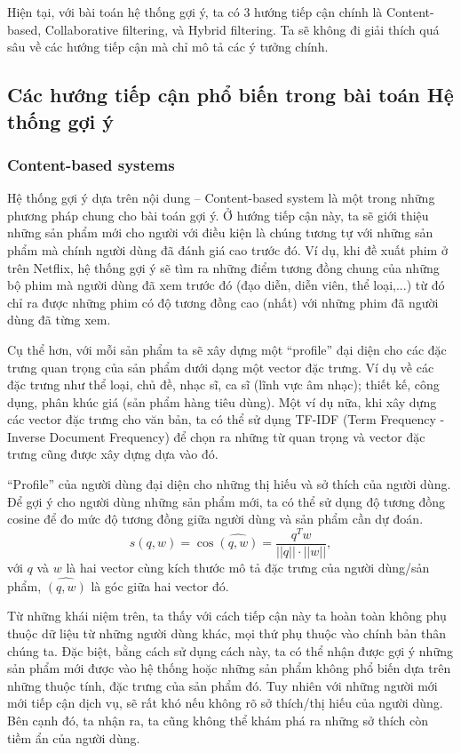 Hiện tại, với bài toán hệ thống gợi ý, ta có 3 hướng tiếp cận chính \cite{survey:sota-rec-system} là Content-based, Collaborative filtering, và Hybrid filtering. Ta sẽ không đi giải thích quá sâu về các hướng tiếp cận mà chỉ mô tả các ý tưởng chính.

\subsection{Các hướng tiếp cận phổ biến trong bài toán Hệ thống gợi ý}

\subsubsection{Content-based systems}
\noindent Hệ thống gợi ý dựa trên nội dung -- Content-based system \cite{content-based-rec} là một trong những phương pháp chung cho bài toán gợi ý. Ở hướng tiếp cận này, ta sẽ giới thiệu những sản phẩm mới cho người với điều kiện là chúng tương tự với những sản phẩm mà chính người dùng đã đánh giá cao trước đó. Ví dụ, khi đề xuất phim ở trên Netflix, hệ thống gợi ý sẽ tìm ra những điểm tương đồng chung của những bộ phim mà người dùng đã xem trước đó (đạo diễn, diễn viên, thể loại,...) từ đó chỉ ra được những phim có độ tương đồng cao (nhất) với những phim đã người dùng đã từng xem.

Cụ thể hơn, với mỗi sản phẩm ta sẽ xây dựng một ``profile'' đại diện cho các đặc trưng quan trọng của sản phẩm dưới dạng một vector đặc trưng. Ví dụ về các đặc trưng như thể loại, chủ đề, nhạc sĩ, ca sĩ (lĩnh vực âm nhạc); thiết kế, công dụng, phân khúc giá (sản phẩm hàng tiêu dùng). Một ví dụ nữa, khi xây dựng các vector đặc trưng cho văn bản, ta có thể sử dụng TF-IDF (Term Frequency - Inverse Document Frequency) để chọn ra những từ quan trọng và vector đặc trưng cũng được xây dựng dựa vào đó.

``Profile'' của người dùng đại diện cho những thị hiếu và sở thích của người dùng. Để gợi ý cho người dùng những sản phẩm mới, ta có thể sử dụng độ tương đồng cosine \cite{cos-sim} để đo mức độ tương đồng giữa người dùng và sản phẩm cần dự đoán.
\begin{equation}
    s(q, w) = \cos{\widehat{(q, w)}} = \frac{q^T w}{||q|| \cdot ||w||},
    \label{eq:cosine-sim}
\end{equation}
với $q$ và $w$ là hai vector cùng kích thước mô tả đặc trưng của người dùng/sản phẩm, $\widehat{(q, w)}$ là góc giữa hai vector đó.

Từ những khái niệm trên, ta thấy với cách tiếp cận này ta hoàn toàn không phụ thuộc dữ liệu từ những người dùng khác, mọi thứ phụ thuộc vào chính bản thân chúng ta. Đặc biệt, bằng cách sử dụng cách này, ta có thể nhận được gợi ý những sản phẩm mới được vào hệ thống hoặc những sản phẩm không phổ biến dựa trên những thuộc tính, đặc trưng của sản phẩm đó. Tuy nhiên với những người mới mới tiếp cận dịch vụ, sẽ rất khó nếu không rõ sở thích/thị hiếu của người dùng. Bên cạnh đó, ta nhận ra, ta cũng không thể khám phá ra những sở thích còn tiềm ẩn của người dùng.

